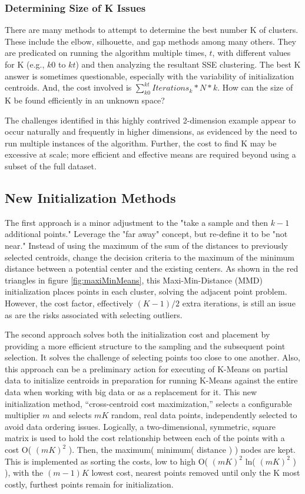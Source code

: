 \documentclass{article}
\begin{document}
\subsubsection{Determining Size of K Issues}

There are many methods to attempt to determine the best number K of clusters.  These include the elbow, silhouette, and gap methods among many others.\cite{UC}  They are predicated on running the algorithm multiple times, $t$, with different values for K (e.g., $k0$ to $kt$) and then analyzing the resultant SSE clustering.  The best K answer is sometimes questionable, especially with the variability of initialization centroids. And, the cost involved is $\sum_{k0}^{kt} Iterations_k * N * k$.  How can the size of K be found efficiently in an unknown space?

The challenges identified in this highly contrived 2-dimension example appear to occur naturally and frequently in higher dimensions, as evidenced by the need to run multiple instances of the algorithm.  Further, the cost to find K may be excessive at scale; more efficient and effective means are required beyond using a subset of the full dataset.

\subsection{New Initialization Methods}

The first approach is a minor adjustment to the "take a sample and then $k-1$ additional points."  Leverage the "far away" concept, but re-define it to be "not near."    Instead of using the maximum of the sum of the distances to previously selected centroids, change the decision criteria to the maximum of the minimum distance between a potential center and the existing centers.  As shown in the red triangles in figure \ref{fig:maxiMinMeans}, this Maxi-Min-Distance (MMD) initialization places points in each cluster, solving the adjacent point problem.  However, the cost factor, effectively $(K-1)/2$ extra iterations, is still an issue as are the risks associated with selecting outliers.

The second approach solves both the initialization cost and placement by providing a more efficient structure to the sampling and the subsequent point selection.   It solves the challenge of selecting points too close to one another.  Also, this approach can be a preliminary action for executing of K-Means on partial data to initialize centroids in preparation for running K-Means against the entire data when working with big data or as a replacement for it.  This new initialization method, “cross-centroid cost maximization,” selects a configurable multiplier $m$ and selects $mK$ random, real data points, independently selected to avoid data ordering issues.  Logically, a two-dimensional, symmetric, square matrix is used to hold the cost relationship between each of the points with a cost O( $(mK)^2$ ).  Then, the maximum( minimum( distance ) ) nodes are kept.  This is implemented as sorting the costs, low to high O( $(mK)^2$ ln( $(mK)^2$ ) ), with the $(m-1)K$ lowest cost, nearest points removed until only the K most costly, furthest points remain for initialization.
\end{document}
